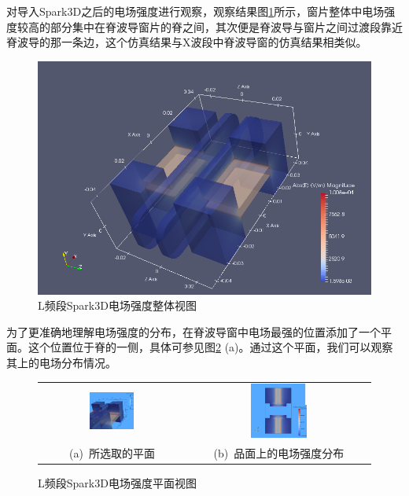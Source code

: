 \documentclass[master]{thesis-uestc}
\begin{document}
对导入Spark3D之后的电场强度进行观察，观察结果图\ref{fig:LSP3D电场强度斜视图}所示，窗片整体中电场强度较高的部分集中在脊波导窗片的脊之间，其次便是脊波导与窗片之间过渡段靠近脊波导的那一条边，这个仿真结果与X波段中脊波导窗的仿真结果相类似。
\begin{figure}[!htb]
    \centering
    \includegraphics[width=0.45\linewidth]{pic/chapter4/L波段Spark3D电场.png}
    \caption{L频段Spark3D电场强度整体视图}
    \label{fig:LSP3D电场强度斜视图}
\end{figure}
为了更准确地理解电场强度的分布，在脊波导窗中电场最强的位置添加了一个平面。这个位置位于脊的一侧，具体可参见图\ref{fig:L频段Spark3D电场强度平面视图} (a)。通过这个平面，我们可以观察其上的电场分布情况。
\begin{figure}[!htb]
    \small
    \centering
    \begin{tabular}{@{\ }c@{\ }c}
        \includegraphics[width=0.32\textwidth]{pic/chapter4/LSP3D截取平面.png} & 
        \hspace{5pt}
        \includegraphics[width=0.32\textwidth]{pic/chapter4/LSP3D平面上的电场.png}     \\
        \mbox{\small (a) 所选取的平面}                                                                               & 
        \mbox{\small (b) 品面上的电场强度分布}                                                                                  \\
    \end{tabular}
    \caption{L频段Spark3D电场强度平面视图}
    \label{fig:L频段Spark3D电场强度平面视图}
\end{figure}
\end{document}
